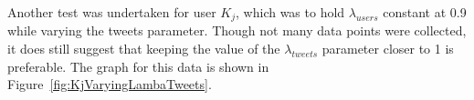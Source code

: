 






Another test was undertaken for user $K_{j}$, which was to hold $\lambda_{users}$ constant at 0.9 while varying the tweets parameter. Though not many data points were collected, it does still suggest that keeping the value of the $\lambda_{tweets}$ parameter closer to 1 is preferable. The graph for this data is shown in Figure~\ref{fig:KjVaryingLambaTweets}.






